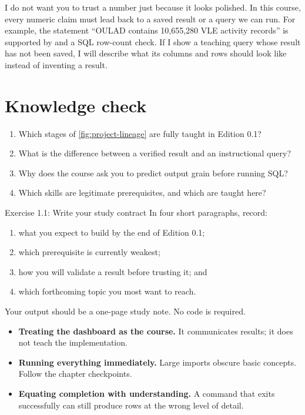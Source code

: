 I do not want you to trust a number just because it looks polished. In this
course, every numeric claim must lead back to a saved result or a query we can
run. For example, the statement ``OULAD contains 10,655,280 VLE activity
records'' is supported by
 and a SQL row-count check.
If I show a teaching query whose result has not been saved, I will describe
what its columns and rows should look like instead of inventing a result.

\section{Knowledge check}

\begin{enumerate}
  \item Which stages of \cref{fig:project-lineage} are fully taught in Edition
    0.1?
  \item What is the difference between a verified result and an instructional
    query?
  \item Why does the course ask you to predict output grain before running SQL?
  \item Which skills are legitimate prerequisites, and which are taught here?
\end{enumerate}

\begin{exercisebox}{Exercise 1.1: Write your study contract}
In four short paragraphs, record:
\begin{enumerate}
  \item what you expect to build by the end of Edition 0.1;
  \item which prerequisite is currently weakest;
  \item how you will validate a result before trusting it; and
  \item which forthcoming topic you most want to reach.
\end{enumerate}
Your output should be a one-page study note. No code is required.
\end{exercisebox}

\begin{commonmistakes}
\begin{itemize}
  \item \textbf{Treating the dashboard as the course.} It communicates results;
    it does not teach the implementation.
  \item \textbf{Running everything immediately.} Large imports obscure basic
    concepts. Follow the chapter checkpoints.
  \item \textbf{Equating completion with understanding.} A command that exits
    successfully can still produce rows at the wrong level of detail.
\end{itemize}
\end{commonmistakes}


